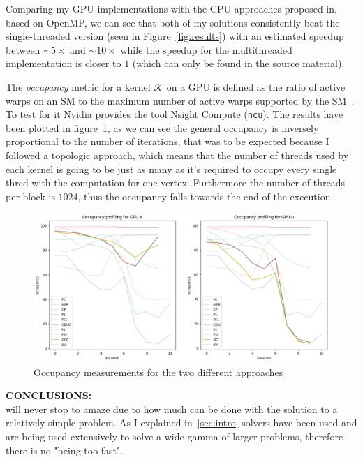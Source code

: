 \documentclass[a4paper,10pt]{article}
\begin{document}
Comparing my GPU implementations with the CPU approaches proposed in\cite{generic-he-boruvka}, based on OpenMP, we can see that both of my solutions consistently beat the single-threaded version (seen in Figure~\ref{fig:results}) with an estimated speedup between $\sim5\times$ and $\sim10\times$ while the speedup for the multithreaded implementation is closer to $1$ (which can only be found in the source material).

\medskip
The \emph{occupancy} metric for a kernel $\mathcal{K}$ on a GPU is defined as the ratio of active warps on an SM to the maximum number of active warps supported by the SM~\cite{def-occupancy}. To test for it Nvidia provides the tool Nsight Compute (\texttt{ncu}). The results have been plotted in figure~\ref{fig:occupancy}, as we can see the general occupancy is inversely proportional to the number of iterations, that was to be expected because I followed a topologic approach, which means that the number of threads used by each kernel is going to be just as many as it's required to occupy every single thred with the computation for one vertex. Furthermore the number of threads per block is $1024$, thus the occupancy falls towards the end of the execution.
\begin{figure}[!h]
	\centering
	\includegraphics[scale=0.5]{fig/occupancy.png}
	\caption{Occupancy measurements for the two different approaches}
	\label{fig:occupancy}
\end{figure}

\bigskip
{}
\makeatletter{}\makeatother\label{sec:final-thoughts}
\noindent
\textbf{CONCLUSIONS:}
\\
\mstp will never stop to amaze due to how much can be done with the solution to a relatively simple problem. As I explained in~\ref{sec:intro} \mstp solvers have been used and are being used extensively to solve a wide gamma of larger problems, therefore there is no "being too fast".
\end{document}

